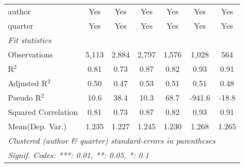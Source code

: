 \begin{tabular}{lcccccc}
   author                                                     & Yes           & Yes          & Yes           & Yes           & Yes           & Yes\\  
   quarter                                                    & Yes           & Yes          & Yes           & Yes           & Yes           & Yes\\  
   \midrule
   \emph{Fit statistics}\\
   Observations                                               & 5,113         & 2,884        & 2,797         & 1,576         & 1,028         & 564\\  
   R$^2$                                                      & 0.81          & 0.73         & 0.87          & 0.82          & 0.93          & 0.91\\  
   Adjusted R$^2$                                             & 0.50          & 0.47         & 0.53          & 0.51          & 0.51          & 0.48\\  
   Pseudo R$^2$                                               & 10.6          & 38.4         & 10.3          & 68.7          & -941.6        & -18.8\\  
   Squared Correlation                                        & 0.81          & 0.73         & 0.87          & 0.82          & 0.93          & 0.91\\  
Mean(Dep. Var.) & 1.235 & 1.227 & 1.245 & 1.230 & 1.268 & 1.265 \\
   \midrule \midrule
   \multicolumn{7}{l}{\emph{Clustered (author \& quarter) standard-errors in parentheses}}\\
   \multicolumn{7}{l}{\emph{Signif. Codes: ***: 0.01, **: 0.05, *: 0.1}}\\
\end{tabular}
\par\endgroup
